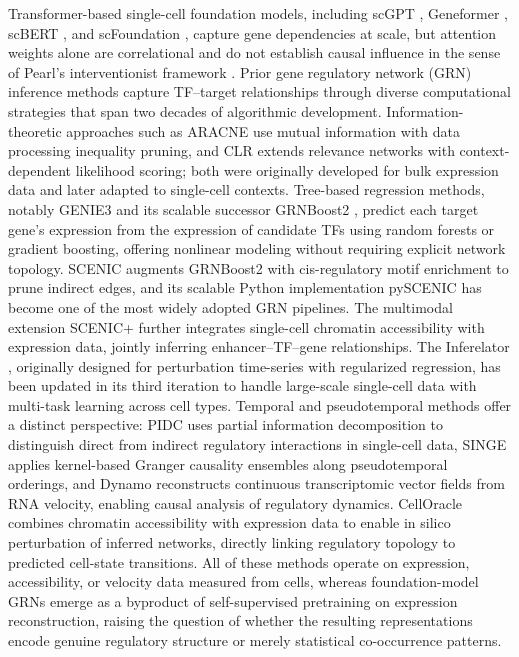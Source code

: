 \documentclass[10pt,letterpaper]{article}
\begin{document}
Transformer-based \cite{vaswani_attention_2017} single-cell foundation models,
including scGPT \cite{cui_scgpt_2023}, Geneformer
\cite{theodoris_geneformer_2023}, scBERT \cite{yang_scbert_2022}, and
scFoundation \cite{hao_scfoundation_2024}, capture gene dependencies at
scale, but attention weights alone are correlational and do not establish
causal influence in the sense of Pearl's interventionist framework
\cite{pearl_causality_2009}. Prior gene regulatory network (GRN) inference methods capture TF--target
relationships through diverse computational strategies that span two decades
of algorithmic development. Information-theoretic approaches such as ARACNE
\cite{margolin_aracne_2006} use mutual information with data processing
inequality pruning, and CLR \cite{faith_clr_2007} extends relevance networks
with context-dependent likelihood scoring; both were originally developed for
bulk expression data and later adapted to single-cell contexts. Tree-based
regression methods, notably GENIE3 \cite{huynhthu_genie3_2010} and its
scalable successor GRNBoost2 \cite{moerman_grnboost2_2019}, predict each
target gene's expression from the expression of candidate TFs using random
forests or gradient boosting, offering nonlinear modeling without requiring
explicit network topology. SCENIC \cite{aibar_scenic_2017} augments GRNBoost2
with cis-regulatory motif enrichment to prune indirect edges, and its scalable
Python implementation pySCENIC \cite{vandesande_pyscenic_2020} has become one
of the most widely adopted GRN pipelines. The multimodal extension SCENIC+
\cite{bravo_scenicplus_2023} further integrates single-cell chromatin
accessibility with expression data, jointly inferring enhancer--TF--gene
relationships. The Inferelator \cite{bonneau_grn_review_2007}, originally
designed for perturbation time-series with regularized regression, has been
updated in its third iteration \cite{gibbs_inferelator3_2022} to handle
large-scale single-cell data with multi-task learning across cell types.
Temporal and pseudotemporal methods offer a distinct perspective:
PIDC \cite{chan_pidc_2017} uses partial information decomposition to
distinguish direct from indirect regulatory interactions in single-cell data,
SINGE \cite{deshpande_singe_2022} applies kernel-based Granger causality
ensembles along pseudotemporal orderings, and Dynamo \cite{qiu_dynamo_2022}
reconstructs continuous transcriptomic vector fields from RNA velocity,
enabling causal analysis of regulatory dynamics. CellOracle
\cite{kamimoto_celloracle_2023} combines chromatin accessibility with
expression data to enable in silico perturbation of inferred networks, directly
linking regulatory topology to predicted cell-state transitions. All of these
methods operate on expression, accessibility, or velocity data measured from
cells, whereas foundation-model GRNs emerge as a byproduct of self-supervised
pretraining on expression reconstruction, raising the question of whether the
resulting representations encode genuine regulatory structure or merely
statistical co-occurrence patterns.
\end{document}
